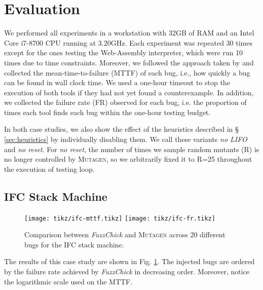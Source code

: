 \documentclass[sigconf,review,anonymous]{acmart}
\newcommand{\fuzzchick}{\textit{FuzzChick}\xspace}
\newcommand{\mutagen}{\textsc{Mutagen}\xspace}
\begin{document}

\section{Evaluation}
\label{sec:evaluation}

We performed all experiments in a workstation with 32GB of RAM and an Intel Core
i7-8700 CPU running at 3.20GHz.
%
Each experiment was repeated 30 times except for the ones testing the
{Web-Assembly} interpreter, which were run 10 times due to time constraints.
%
Moreover, we followed the approach taken by
\citeauthor{lampropoulos2019coverage} and collected the mean-time-to-failure
(MTTF) of each bug, i.e., how quickly a bug can be found in wall clock time.
%
We used a one-hour timeout to stop the execution of both tools if they had not
yet found a counterexample.
%
In addition, we collected the failure rate (FR) observed for each bug, i.e. the
proportion of times each tool finds each bug within the one-hour testing budget.
%

In both case studies, we also show the effect of the heuristics described in \S
\ref{sec:heuristics} by individually disabling them.
%
We call these variants \textit{no LIFO} and \textit{no reset}.
%
For \textit{no reset}, the number of times we sample random mutants (R) is no
longer controlled by \mutagen, so we arbitrarily fixed it to R=25 throughout the
execution of testing loop.

\subsection{IFC Stack Machine}

\begin{figure}[b]
  \centering
  \texttt{[image: tikz/ifc-mttf.tikz]}
  \texttt{[image: tikz/ifc-fr.tikz]}
  \vspace{-20pt}
  \caption{\label{fig:results:ifc} Comparison between \fuzzchick and \mutagen
    across 20 different bugs for the IFC stack machine. }
\vspace{-5pt}
\end{figure}


The results of this case study are shown in Fig. \ref{fig:results:ifc}.
%
%
The injected bugs are ordered by the failure rate achieved by \fuzzchick in
decreasing order.
%
Moreover, notice the logarithmic scale used on the MTTF.
\end{document}
